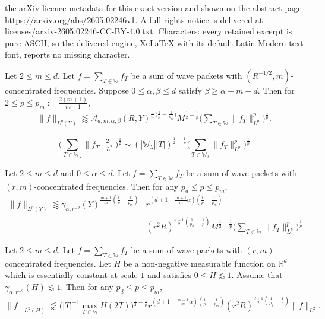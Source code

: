 \documentclass[10pt,a4paper]{amsart}
\newcommand{\R}{\mathbb{R}}
\newcommand{\W}{\mathbb{W}}
\newcommand{\less}{\lessapprox}
\newcommand{\les}{\lesssim}
\begin{document}
the arXiv licence metadata for this exact version and shown on the abstract page https://arxiv.org/abs/2605.02246v1. A full rights notice is delivered at licenses/arxiv-2605.02246-CC-BY-4.0.txt. Characters: every retained excerpt is pure ASCII, so the delivered engine, XeLaTeX with its default Latin Modern text font, reports no missing character.
\begin{theorem}\label{thm:LpWeightedDecouplingConcentratedRefined}
	Let $2\leq m \leq d$. Let $f = \sum_{T \in \W} f_T$ be a sum of wave packets with $(R^{-1/2}, m)$-concentrated frequencies. Suppose  $0\leq \alpha, \beta \leq d$ satisfy $\beta \geq \alpha +m - d$. Then for $2\leq p \leq p_m:= \frac{2(m+1)}{m-1}$, 
	\begin{align*}
		\| f \|_{L^p(Y)} \less \mathcal{A}_{d,m,\alpha,\beta}(R, Y)^{\frac{1}{m}\big(\frac{1}{p}-\frac{1}{p_m}\big)} 
		M^{\frac{1}{2}-\frac{1}{p}}   \bigg( \sum_{T\in \W} \| f_T \|_{L^p}^p \bigg)^{\frac{1}{p}}.
	\end{align*}
\end{theorem}

	\begin{equation}\label{eqn:wavepacketNorm}
		\bigg( \sum_{T\in \W_\lambda} \| f_T\|_{L^2}^2  \bigg)^\frac{1}{2} \sim  (|\W_\lambda| |T|)^{\frac{1}{2}-\frac{1}{p}} \bigg( \sum_{T\in \W_\lambda}  \| f_T\|_{L^p}^p \bigg)^{\frac{1}{p}} 
	\end{equation}

\begin{theorem}\label{thm:linearWeightedDecoupling}
	Let $2\leq m \leq d$ and $0\leq \alpha \leq d$. Let $f = \sum_{T \in \W} f_T$ be a sum of wave packets with $(r, m)$-concentrated frequencies. Then for any $p_d\leq p\leq p_m$, 
	\begin{align*}
		\| f\|_{L^p(Y)} \less \gamma_{\alpha,r^{-2}}(Y)^{\frac{m+1}{m}(\frac{1}{p}-\frac{1}{p_m})} &r^{(d+1 - \frac{m+1}{m}\alpha)(\frac{1}{p}-\frac{1}{p_m})} \\ &(r^2 R)^{\frac{d+1}{2}(\frac{1}{p_d} -\frac{1}{p})}  
	M^{\frac{1}{2}-\frac{1}{p}}   \bigg( \sum_{T\in \W} \| f_T \|_{L^p}^p \bigg)^{\frac{1}{p}}. 
	\end{align*}
\end{theorem}

\begin{theorem}\label{thm:measureVer}
	Let $2\leq m \leq d$. Let $f = \sum_{T \in \W} f_T$ be a sum of wave packets with $(r, m)$-concentrated frequencies. 
	Let $H$ be a non-negative measurable function on $\R^d$ which is essentially
	constant at scale $1$ and satisfies $0\leq H\les 1$. Assume that $\gamma_{\alpha,r^{-2}}(H) \les 1$. Then for any $p_d\leq p\leq p_m$, 
	\[ \| f\|_{L^2(H)} \less \big(  |T|^{-1} \max_{T\in \W} H(2T) \big)^{\frac{1}{2}-\frac{1}{p}} r^{(d+1 - \frac{m+1}{m}\alpha)(\frac{1}{p}-\frac{1}{p_m})} (r^2 R)^{\frac{d+1}{2}(\frac{1}{p_d} -\frac{1}{p})} \| f\|_{L^2}.  \]
\end{theorem}
\end{document}
